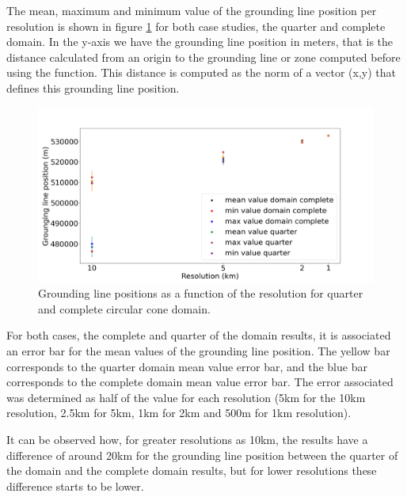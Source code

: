 \documentclass{article}
\begin{document}
The mean, maximum and minimum value of the grounding line position per resolution is shown in figure \ref{Grounding_lines__CONE_comparison} for both case studies, the quarter and complete domain. In the y-axis we have the grounding line position in meters, that is the distance calculated from an origin to the grounding line or zone computed before using the function. This distance is computed as the norm of a vector (x,y) that defines this grounding line position. 

\begin{figure}[!h]
	\centering
	\includegraphics[width=0.8\linewidth]{../fig/Figure_CONE_GL_positions.png}
	\caption{Grounding line positions as a function of the resolution for quarter and complete circular cone domain.}
	\label{Grounding_lines__CONE_comparison}
\end{figure}

For both cases, the complete and quarter of the domain results, it is associated an error bar for the mean values of the grounding line position. The yellow bar corresponds to the quarter domain mean value error bar, and the blue bar corresponds to the complete domain mean value error bar. The error associated was determined as half of the value for each resolution (5km for the 10km resolution, 2.5km for 5km, 1km for 2km and 500m for 1km resolution).

It can be observed how, for greater resolutions as 10km, the results have a difference of around 20km for the grounding line position between the quarter of the domain and the complete domain results, but for lower resolutions these difference starts to be lower. 
\end{document}
